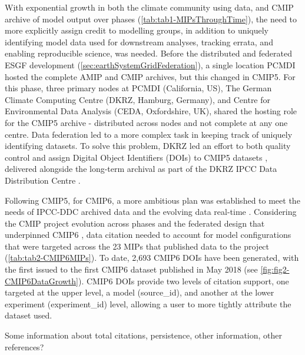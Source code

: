 \documentclass[gmd, preprint]{copernicus}
\newcommand{\mycomment}[1]{}
\def\cred#1{{\color{red}#1}}
\begin{document}
With exponential growth in both the climate community using data, and CMIP archive of model output over phases (\autoref{tab:tab1-MIPsThroughTime}), the need to more explicitly assign credit to modelling groups, in addition to uniquely identifying model data used for downstream analyses, tracking errata, and enabling reproducible science, was needed. Before the distributed and federated ESGF development (\autoref{sec:earthSystemGridFederation}), a single location PCMDI hosted the complete AMIP and CMIP archives, but this changed in CMIP5. For this phase, three primary nodes at PCMDI (California, US), The German Climate Computing Centre (DKRZ, Hamburg, Germany), and Centre for Environmental Data Analysis (CEDA, Oxfordshire, UK), shared the hosting role for the CMIP5 archive - distributed across nodes and not complete at any one centre. Data federation led to a more complex task in keeping track of uniquely identifying datasets. To solve this problem, DKRZ led an effort to both quality control and assign Digital Object Identifiers (DOIs) to CMIP5 datasets \citep{stockhause_quality_2012, stockhause_cmip6_2017}, delivered alongside the long-term archival as part of the DKRZ IPCC Data Distribution Centre \citep[IPCC-DDC;][]{stockhause_twenty-five_2022}.

Following CMIP5, for CMIP6, a more ambitious plan was established to meet the needs of IPCC-DDC archived data and the evolving data real-time \citep{stockhause_cmip6_2017}. Considering the CMIP project evolution across phases and the federated design that underpinned CMIP6 \citep[see \autoref{sec:cmip6ProjectDesign};][]{eyring_overview_2016}, data citation needed to account for model configurations that were targeted across the 23 MIPs that published data to the project (\autoref{tab:tab2-CMIP6MIPs}). To date, 2,693 CMIP6 DOIs have been generated, with the first issued to the first CMIP6 dataset published in May 2018 (see \autoref{fig:fig2-CMIP6DataGrowth}). CMIP6 DOIs provide two levels of citation support, one targeted at the upper level, a model (source\_id), and another at the lower experiment (experiment\_id) level, allowing a user to more tightly attribute the dataset used.

\cred{Some information about total citations, persistence, other information, other references?}
\mycomment{
https://www.wdc-climate.de/ui/statistics?type=cmip6_doi_registration
https://commons.datacite.org/repositories/8orcv25 - Master overview 6012 citations
https://www.wdc-climate.de/ords/f?p=127:2 - CMIP6 data references
https://www.wdc-climate.de/ui/cmip6?input=CMIP6.ScenarioMIP.NOAA-GFDL.GFDL-CM4.ssp585
https://www.wdc-climate.de/ui/cmip6?input=input4MIPs.CMIP6.CMIP.PCMDI
}
\end{document}
